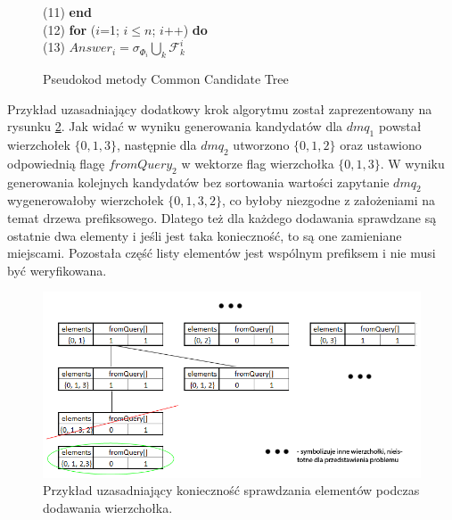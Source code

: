 \begin{figure}[h]
	\hspace*{6em} (11)\hspace{1em} \textbf{end} \\
	\hspace*{6em} (12)\hspace{1em} \textbf{for} ($i$=1; $i \leq n$; $i$++) \textbf{do} \\
	\hspace*{6em} (13)\hspace{2em}    $Answer_i = \sigma_{\Phi_i} \bigcup_k \mathcal{F}_k^i$
	\caption{Pseudokod metody Common Candidate Tree}
	\label{fig:CCTFigure}
\end{figure}

Przykład uzasadniający dodatkowy krok algorytmu został zaprezentowany na rysunku \ref{fig:reorderProblem}. Jak widać w wyniku generowania kandydatów dla \(dmq_1\) powstał wierzchołek \(\{0, 1, 3\}\), następnie dla \(dmq_2\) utworzono \(\{0, 1, 2\}\) oraz ustawiono odpowiednią flagę \(fromQuery_2\) w wektorze flag wierzchołka \(\{0, 1, 3\}\). W wyniku generowania kolejnych kandydatów bez sortowania wartości zapytanie \(dmq_2\) wygenerowałoby wierzchołek \(\{0, 1, 3, 2\}\), co byłoby niezgodne z założeniami na temat drzewa prefiksowego. Dlatego też dla każdego dodawania sprawdzane są ostatnie dwa elementy i jeśli jest taka konieczność, to są one zamieniane miejscami. Pozostała część listy elementów jest wspólnym prefiksem i nie musi być weryfikowana.
\begin{figure}[h]
	\centering
	\includegraphics[width=0.8\linewidth]{figures/reorderProblem}
	\caption{Przykład uzasadniający konieczność sprawdzania elementów podczas dodawania wierzchołka.}
	\label{fig:reorderProblem}
\end{figure}

